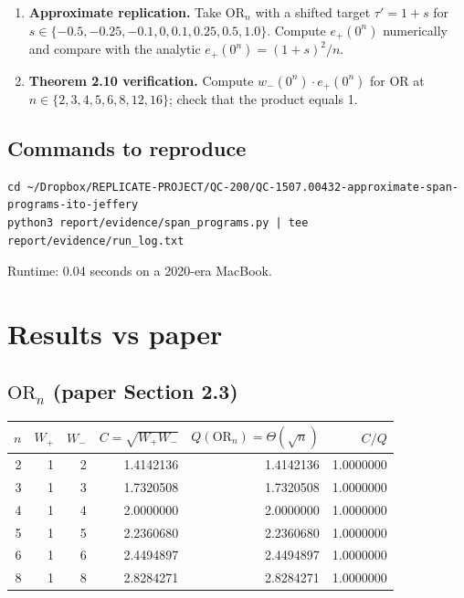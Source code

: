 \documentclass[11pt]{article}
\begin{document}
\begin{enumerate}
\item \textbf{Approximate replication.} Take $\mathrm{OR}_n$ with a shifted target $\tau' = 1 + s$ for $s \in \{-0.5, -0.25, -0.1, 0, 0.1, 0.25, 0.5, 1.0\}$. Compute $e_+(0^n)$ numerically and compare with the analytic $e_+(0^n) = (1+s)^2/n$.

\item \textbf{Theorem 2.10 verification.} Compute $w_-(0^n) \cdot e_+(0^n)$ for OR at $n \in \{2,3,4,5,6,8,12,16\}$; check that the product equals 1.
\end{enumerate}

\subsection{Commands to reproduce}

\begin{lstlisting}
cd ~/Dropbox/REPLICATE-PROJECT/QC-200/QC-1507.00432-approximate-span-programs-ito-jeffery
python3 report/evidence/span_programs.py | tee report/evidence/run_log.txt
\end{lstlisting}

Runtime: 0.04 seconds on a 2020-era MacBook.

\section{Results vs paper}

\subsection{$\mathrm{OR}_n$ (paper Section 2.3)}

\begin{center}
\begin{tabular}{@{}rrrrrr@{}}
\toprule
$n$ & $W_+$ & $W_-$ & $C = \sqrt{W_+ W_-}$ & $Q(\mathrm{OR}_n) = \Theta(\sqrt{n})$ & $C/Q$ \\
\midrule
2 & 1 & 2 & 1.4142136 & 1.4142136 & 1.0000000 \\
3 & 1 & 3 & 1.7320508 & 1.7320508 & 1.0000000 \\
4 & 1 & 4 & 2.0000000 & 2.0000000 & 1.0000000 \\
5 & 1 & 5 & 2.2360680 & 2.2360680 & 1.0000000 \\
6 & 1 & 6 & 2.4494897 & 2.4494897 & 1.0000000 \\
8 & 1 & 8 & 2.8284271 & 2.8284271 & 1.0000000 \\
\bottomrule
\end{tabular}
\end{center}
\end{document}
